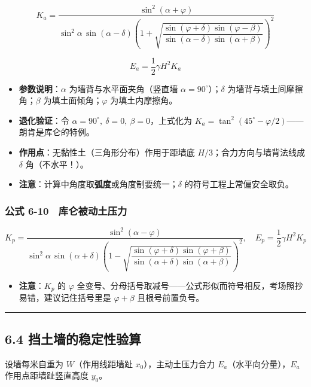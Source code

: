\documentclass[
]{article}
\providecommand{\tightlist}{%
  \setlength{\itemsep}{0pt}\setlength{\parskip}{0pt}}
\begin{document}
\[K_a=\frac{\sin^2(\alpha+\varphi)}{\sin^2\alpha\,\sin(\alpha-\delta)\left(1+\sqrt{\dfrac{\sin(\varphi+\delta)\sin(\varphi-\beta)}{\sin(\alpha-\delta)\sin(\alpha+\beta)}}\right)^2}\]

\[E_a=\frac{1}{2}\gamma H^2K_a\]

\begin{itemize}
\tightlist
\item
  \textbf{参数说明}：\(\alpha\) 为墙背与水平面夹角（竖直墙
  \(\alpha=90^{\circ}\)）；\(\delta\) 为墙背与填土间摩擦角；\(\beta\)
  为填土面倾角；\(\varphi\) 为填土内摩擦角。
\item
  \textbf{退化验证}：令
  \(\alpha=90^{\circ},\ \delta=0,\ \beta=0\)，上式化为
  \(K_a=\tan^2(45^{\circ}-\varphi/2)\)------朗肯是库仑的特例。
\item
  \textbf{作用点}：无黏性土（三角形分布）作用于距墙底
  \(H/3\)；合力方向与墙背法线成 \(\delta\) 角（不水平！）。
\item
  \textbf{注意}：计算中角度取\textbf{弧度}或角度制要统一；\(\delta\)
  的符号工程上常偏安全取负。
\end{itemize}

\subsubsection{公式
6-10　库仑被动土压力}\label{ux516cux5f0f-6-10-ux5e93ux4ed1ux88abux52a8ux571fux538bux529b}

\[K_p=\frac{\sin^2(\alpha-\varphi)}{\sin^2\alpha\,\sin(\alpha+\delta)\left(1-\sqrt{\dfrac{\sin(\varphi+\delta)\sin(\varphi+\beta)}{\sin(\alpha+\delta)\sin(\alpha+\beta)}}\right)^2},\quad E_p=\frac{1}{2}\gamma H^2K_p\]

\begin{itemize}
\tightlist
\item
  \textbf{注意}：\(K_p\) 的 \(\varphi\)
  全变号、分母括号取减号------公式形似而符号相反，考场照抄易错，建议记住括号里是
  \(\varphi+\beta\) 且根号前置负号。
\end{itemize}

\begin{center}\rule{0.5\linewidth}{0.5pt}\end{center}

\subsection{6.4
挡土墙的稳定性验算}\label{ux6321ux571fux5899ux7684ux7a33ux5b9aux6027ux9a8cux7b97}

设墙每米自重为 \(W\)（作用线距墙趾 \(x_0\)），主动土压力合力
\(E_a\)（水平向分量），\(E_a\) 作用点距墙趾竖直高度 \(y_0\)。
\end{document}
